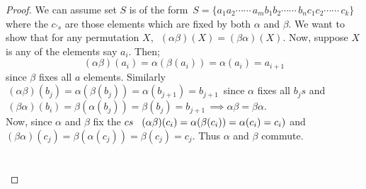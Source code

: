 \documentclass[11pt,a4paper]{article}
\theoremstyle{definition}
\begin{document}
\begin{proof}
We can assume set $S$ is of the form $\, S = \{a_1a_2\cdots\cdots\, a_mb_1b_2\cdots\cdots\, b_nc_1c_2\cdots\cdots\, c_k\}$ where the $c_{'s}$ are those elements which are fixed by both $\alpha$ and $\beta$. We want to show that for any permutation $X$, $\,\, (\alpha\beta)(X) = (\beta\alpha)(X)$. Now, suppose $X$ is any of the elements say $a_i$. Then;$$(\alpha\beta)(a_i) = \alpha(\beta(a_i)) = \alpha (a_i) = a_{i+1}$$
since $\beta$ fixes all $a$ elements. Similarly $\, (\alpha\beta)(b_j) = \alpha(\beta(b_j))  = \alpha(b_{j+1}) = b_{j+1}\,$ since $\alpha$ fixes all $b_js$ and $\, (\beta \alpha)(b_i) = \beta (\alpha(b_j)) = \beta (b_j) = b_{j+1} \, \implies \alpha\beta = \beta \alpha$.\\
Now, since $\alpha$ and $\beta$ fix the $cs\hspace{0.3cm}(\alpha\beta)(c_i) = \alpha (\beta (c_i)) = \alpha(c_i) = c_i)$  and\\ $(\beta \alpha)(c_j) = \beta (\alpha (c_j)) = \beta (c_j) = c_j$. Thus $\alpha$ and $\beta$ commute.\\\\\\
\end{proof}
\end{document}
